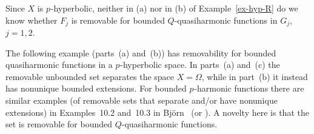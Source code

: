 \documentclass[a4paper,twoside]{article}
\theoremstyle{propositional}
\theoremstyle{descriptive}
\theoremstyle{remarkstyle}
\newcommand{\Om}{\Omega}
\newcommand{\p}{{$p\mspace{1mu}$}}
\numberwithin{equation}{section}
\begin{document}
Since $X$ is \p-hyperbolic, neither in (a) nor in (b) of
Example~\ref{ex-hyp-R} do we know whether
$F_j$ is removable for bounded $Q$-quasiharmonic functions
in $G_j$, $j=1,2$.

The following example (parts~(a) and~(b)) has
removability for 
bounded quasiharmonic functions in a \p-hyperbolic space.
In parts~(a) and~(c) the removable unbounded set separates the
space $X=\Om$, while in part~(b) it instead has nonunique bounded extensions.
For bounded \p-harmonic functions there 
are similar examples (of removable sets that separate and/or have nonunique extensions)
in Examples~10.2 and~10.3 in Bj\"orn~\cite{ABremove}
(or \cite[Example~12.27 and 12.28]{BBbook}).
A novelty here is that the set is removable for 
bounded $Q$-quasiharmonic functions.
 
\end{document}
